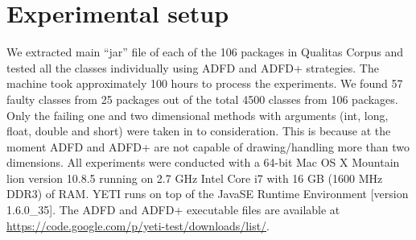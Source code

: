 \documentclass[conference]{IEEEtran}
\begin{document}





\section{Experimental setup}
We extracted main ``jar'' file of each of the 106 packages in Qualitas Corpus{} and tested all the classes individually using ADFD and ADFD+ strategies. The machine took approximately 100 hours to process the experiments. We found 57 faulty classes from 25 packages out of the total 4500 classes from 106 packages. Only the failing one and two dimensional methods with arguments (int, long, float, double and short) were taken in to consideration. This is because at the moment ADFD and ADFD+ are not capable of drawing/handling more than two dimensions. All experiments were conducted with a 64-bit Mac OS X Mountain lion version 10.8.5 running on 2.7 GHz Intel Core i7 with 16 GB (1600 MHz DDR3) of RAM. YETI runs on top of the Java\texttrademark  SE Runtime Environment [version 1.6.0\_35]. The ADFD and ADFD+ executable files are available at \url{https://code.google.com/p/yeti-test/downloads/list/}. 
\end{document}
